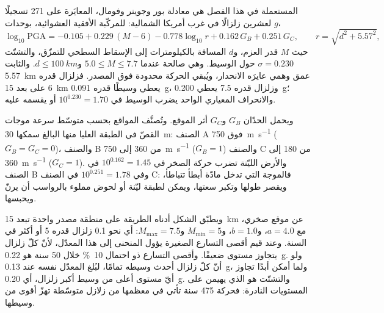  المستعملة في هذا الفصل هي معادلة بور وجوينر وفومال، المعايَرة على 271 تسجيلًا
لعشرين زلزالًا في غرب أمريكا الشمالية: للمركّبة الأفقية العشوائية، بوحدات $g$،
\begin{equation}
\log_{10}\mathrm{PGA} = -0.105 + 0.229\,(M - 6) - 0.778\log_{10} r + 0.162\,G_B + 0.251\,G_C,
\qquad r = \sqrt{d^2 + 5.57^2},
\label{eq:b2:geological-hazards:gmpe}
\end{equation}
حيث $M$ قدر العزم، و$d$ المسافة بالكيلومترات إلى الإسقاط السطحي
للتمزّق، والتشتّت $\sigma = 0.230$ حول الوسيط. وهي صالحة عندما $5.0 \leq M \leq 7.7$ و$d
\leq \qty{100}{km}$. والثابت \qty{5.57}{km} عمق وهمي عايرَه الانحدار،
ويُبقي الحركة محدودة فوق المصدر. فزلزال قدره 6 على بعد \qty{15}{km} يعطي وسيطًا قدره
\qty{0.091}{g}، وزلزال قدره 7.5 يعطي \qty{0.200}{g}؛ والانحراف المعياري الواحد يضرب
الوسيط في $10^{0.230} = 1.70$ أو يقسمه عليه.

ويحمل الحدّان $G_B$ و$G_C$ أثر الموقع. وتُصنَّف المواقع بحسب متوسّط سرعة موجات القصّ
في الطبقة العليا منها البالغ سمكها \qty{30}{m}: الصنف A فوق \qty{750}{m.s^{-1}} ($G_B = G_C = 0$)، والصنف B من
360 إلى \qty{750}{m.s^{-1}} ($G_B = 1$) والصنف C من 180 إلى \qty{360}{m.s^{-1}} ($G_C = 1$). والأرض
الليّنة تضرب حركة الصخر في $10^{0.162} = 1.45$ في الصنف B وفي $10^{0.251} = 1.78$ في الصنف
C: فالموجة التي تدخل مادّة أبطأ تتباطأ، ويقصر طولها وتكبر سعتها، ويمكن لطبقة ليّنة أو
لحوض مملوء بالرواسب أن يرنّ ويحبسها.

ويطبّق الشكل أدناه الطريقة على منطقة مصدر واحدة تبعد \qty{15}{km} عن موقع صخري، مع $a
= 4.0$، و$b = 1.0$، و$M_{\min} = 5$ و$M_{\max} = 7.5$: أي نحو 0.1 زلزال قدره 5 أو
أكثر في السنة. وعند قيم أقصى التسارع الصغيرة يؤول المنحنى إلى هذا المعدّل، لأنّ كلّ زلزال يتجاوز
مستوى ضعيفًا. وأقصى التسارع ذو احتمال \qty{10}{\percent} خلال 50 سنة هو \qty{0.22}{g}. ولو أنّ كلّ زلزال أحدث
وسيطه تمامًا، لبُلغ المعدّل نفسه عند \qty{0.13}{g}، ولما أمكن أبدًا تجاوز أيّ مستوى أعلى من وسيط
أكبر زلزال، أي \qty{0.20}{g}. والتشتّت هو الذي يهيمن على المستويات
النادرة: فحركة  475 سنة تأتي في معظمها من زلازل متوسّطة تهزّ أقوى من
وسيطها.

